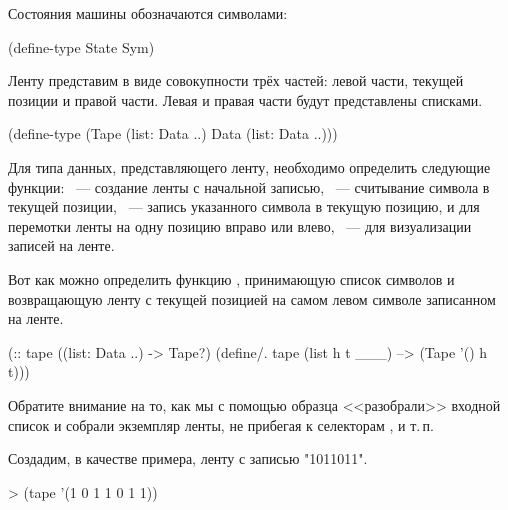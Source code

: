 Состояния машины обозначаются символами:
\begin{SchemeCode}
(define-type State Sym)
\end{SchemeCode}

Ленту представим в виде совокупности трёх частей: левой части, текущей позиции и правой части. Левая и правая части будут представлены списками. 

\begin{SchemeCode}
(define-type (Tape (list: Data ..) Data (list: Data ..)))
\end{SchemeCode}

Для типа данных, представляющего ленту, необходимо определить следующие функции: ~--- создание ленты с начальной записью, ~--- считывание символа в текущей позиции, ~--- запись указанного символа в текущую позицию,  и  для перемотки ленты на одну позицию вправо или влево, ~--- для визуализации записей на ленте.


Вот как можно определить функцию , принимающую список символов и возвращающую ленту с текущей позицией на самом левом символе записанном на ленте.
\begin{Definition}[emph={h,t}]
(:: tape ((list: Data ..) -> Tape?)
  (define/. tape
    (list h t ___) --> (Tape '() h t)))
\end{Definition}
Обратите внимание на то, как мы с помощью образца <<разобрали>> входной список и собрали экземпляр ленты, не прибегая к селекторам ,  и т.\,п.

\begin{example}{Создадим, в качестве примера, ленту с записью "1011011".}
\begin{ExampleCode}
> (tape '(1 0 1 1 0 1 1))
\end{ExampleCode}
\end{example}

